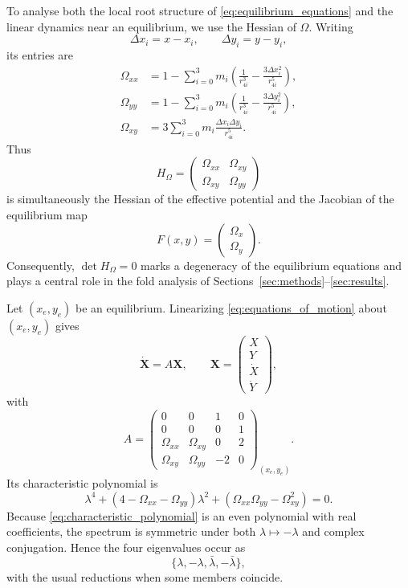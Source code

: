 To analyse both the local root structure of
\eqref{eq:equilibrium_equations} and the linear dynamics near an
equilibrium, we use the Hessian of $\Omega$. Writing
\[
\Delta x_i=x-x_i,
\qquad
\Delta y_i=y-y_i,
\]
its entries are
\begin{equation}
\begin{aligned}
\Omega_{xx}
&=
1-\sum_{i=0}^{3}m_i
\left(
\frac{1}{r_{4i}^3}
-
\frac{3\Delta x_i^2}{r_{4i}^5}
\right),
\\
\Omega_{yy}
&=
1-\sum_{i=0}^{3}m_i
\left(
\frac{1}{r_{4i}^3}
-
\frac{3\Delta y_i^2}{r_{4i}^5}
\right),
\\
\Omega_{xy}
&=
3\sum_{i=0}^{3}m_i
\frac{\Delta x_i\Delta y_i}{r_{4i}^5}.
\end{aligned}
\label{eq:hessian_entries}
\end{equation}
Thus
\begin{equation}
H_\Omega
=
\begin{pmatrix}
\Omega_{xx} & \Omega_{xy}\\
\Omega_{xy} & \Omega_{yy}
\end{pmatrix}
\label{eq:hessian}
\end{equation}
is simultaneously the Hessian of the effective potential and the Jacobian
of the equilibrium map
\[
F(x,y)=
\begin{pmatrix}
\Omega_x\\
\Omega_y
\end{pmatrix}.
\]
Consequently, $\det H_\Omega=0$ marks a degeneracy of the equilibrium
equations and plays a central role in the fold analysis of Sections~\ref{sec:methods}--\ref{sec:results}.

Let $(x_e,y_e)$ be an equilibrium. Linearizing
\eqref{eq:equations_of_motion} about $(x_e,y_e)$ gives
\begin{equation}
\dot{\mathbf X}=A\mathbf X,
\qquad
\mathbf X=
\begin{pmatrix}
X\\Y\\\dot X\\\dot Y
\end{pmatrix},
\end{equation}
with
\begin{equation}
A=
\begin{pmatrix}
0 & 0 & 1 & 0\\
0 & 0 & 0 & 1\\
\Omega_{xx} & \Omega_{xy} & 0 & 2\\
\Omega_{xy} & \Omega_{yy} & -2 & 0
\end{pmatrix}_{(x_e,y_e)} .
\label{eq:variational_matrix}
\end{equation}
Its characteristic polynomial is
\begin{equation}
\lambda^4
+
\left(4-\Omega_{xx}-\Omega_{yy}\right)\lambda^2
+
\left(\Omega_{xx}\Omega_{yy}-\Omega_{xy}^2\right)
=0.
\label{eq:characteristic_polynomial}
\end{equation}
Because \eqref{eq:characteristic_polynomial} is an even polynomial with real
coefficients, the spectrum is symmetric under both
$\lambda\mapsto-\lambda$ and complex conjugation. Hence the four
eigenvalues occur as
\[
\{\lambda,-\lambda,\bar{\lambda},-\bar{\lambda}\},
\]
with the usual reductions when some members coincide.


